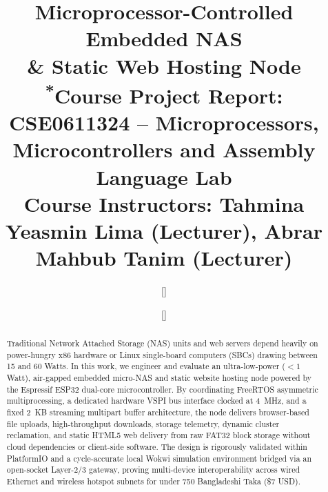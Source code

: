 ﻿\documentclass[conference]{IEEEtran}
\begin{document}
\title{Microprocessor-Controlled Embedded NAS \\& Static Web Hosting Node\\
{\footnotesize \textsuperscript{*}Course Project Report: CSE0611324 -- Microprocessors, Microcontrollers and Assembly Language Lab}\\
{\footnotesize \textbf{Course Instructors:} Tahmina Yeasmin Lima (Lecturer), Abrar Mahbub Tanim (Lecturer)}}

\author{
\and[\linebreak\hfill]
\and[\hfill\linebreak]
}

\maketitle

\begin{abstract}
Traditional Network Attached Storage (NAS) units and web servers depend heavily on power-hungry x86 hardware or Linux single-board computers (SBCs) drawing between 15 and 60 Watts. In this work, we engineer and evaluate an ultra-low-power ($<1$ Watt), air-gapped embedded micro-NAS and static website hosting node powered by the Espressif ESP32 dual-core microcontroller. By coordinating FreeRTOS asymmetric multiprocessing, a dedicated hardware VSPI bus interface clocked at 4~MHz, and a fixed 2~KB streaming multipart buffer architecture, the node delivers browser-based file uploads, high-throughput downloads, storage telemetry, dynamic cluster reclamation, and static HTML5 web delivery from raw FAT32 block storage without cloud dependencies or client-side software. The design is rigorously validated within PlatformIO and a cycle-accurate local Wokwi simulation environment bridged via an open-socket Layer-2/3 gateway, proving multi-device interoperability across wired Ethernet and wireless hotspot subnets for under 750 Bangladeshi Taka (\$7 USD).
\end{abstract}
\end{document}
